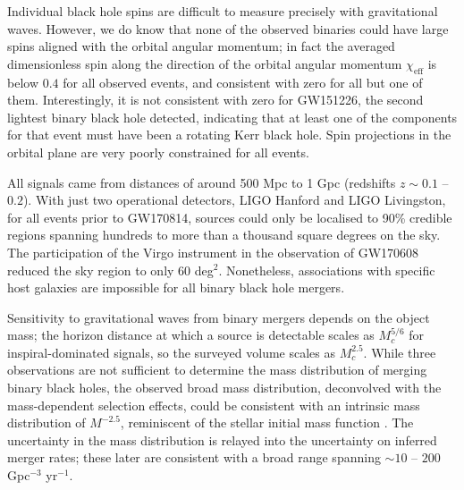 \documentclass[iop,onecolumn]{revtex4}
\newcommand{\todo}[1]{\textcolor{red}{#1}}
\begin{document}


Individual black hole spins are difficult to measure precisely with gravitational waves.  However, we do know that none of the observed binaries could have large spins aligned with the orbital angular momentum; in fact the averaged dimensionless spin along the direction of the orbital angular momentum $\chi_\textrm{eff}$ is below $0.4$ for all observed events, and consistent with zero for all but one of them.  Interestingly, it is not consistent with zero for GW151226, the second lightest binary black hole detected, indicating that at least one of the components for that event must have been a rotating Kerr black hole.  Spin projections in the orbital plane are very poorly constrained for all events.

All signals came from distances of around 500 Mpc to 1 Gpc (redshifts $z\sim 0.1$ -- $0.2$).  With just two operational detectors, LIGO Hanford and LIGO Livingston, for all events prior to GW170814, sources could only be localised to 90\% credible regions spanning hundreds to more than a thousand square degrees on the sky.  The participation of the Virgo instrument in the observation of GW170608 reduced the sky region to only 60 deg$^2$.  Nonetheless, associations with specific host galaxies are impossible for all binary black hole mergers.  

Sensitivity to gravitational waves from binary mergers depends on the object mass; the horizon distance at which a source is detectable scales as $M_c^{5/6}$ for inspiral-dominated signals, so the surveyed volume scales as $M_c^{2.5}$.  While three observations are not sufficient to determine the mass distribution of merging binary black holes, the observed broad mass distribution, deconvolved with the mass-dependent selection effects, could be consistent with an intrinsic mass distribution of $M^{-2.5}$, reminiscent of the stellar initial mass function \citep{Salpeter:1955}.  The uncertainty in the mass distribution is relayed into the uncertainty on inferred merger rates; these later are consistent with a broad range spanning $\sim 10$ -- $200$ Gpc$^{-3}$ yr$^{-1}$.  
\end{document}
